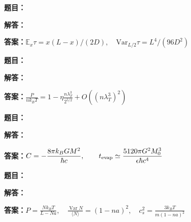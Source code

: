 \documentclass[lang=cn,color=blue,11pt]{elegantbook}
\begin{document}
\par\smallskip\noindent\hrulefill\par\medskip
{}\par
\noindent\textbf{题目：}
\par\noindent\textbf{解答：}
\par\noindent\textbf{答案：}\(\displaystyle \mathbb E_x\tau=x(L-x)/(2D),\quad \mathrm{Var}_{L/2}\tau=L^4/(96D^2)\)\par
\par\smallskip\noindent\hrulefill\par\medskip
{}\par
\noindent\textbf{题目：}
\par\noindent\textbf{解答：}
\par\noindent\textbf{答案：}\(\displaystyle \frac{P}{nk_BT}=1-\eta\frac{n\lambda_T^3}{2^{5/2}}+O((n\lambda_T^3)^2)\)\par
\par\smallskip\noindent\hrulefill\par\medskip
{}\par
\noindent\textbf{题目：}
\par\noindent\textbf{解答：}
\par\noindent\textbf{答案：}\(\displaystyle C=-\frac{8\pi k_BG M^2}{\hbar c},\qquad t_{\rm evap}\simeq\frac{5120\pi G^2M_0^3}{\epsilon\hbar c^4}\)\par
\par\smallskip\noindent\hrulefill\par\medskip
{}\par
\noindent\textbf{题目：}
\par\noindent\textbf{解答：}
\par\noindent\textbf{答案：}\(\displaystyle P=\frac{Nk_BT}{L-Na},\quad \frac{\operatorname{Var}N}{\langle N\rangle}=(1-na)^2,\quad c_s^2=\frac{3k_BT}{m(1-na)^2}\)\par
\end{document}
